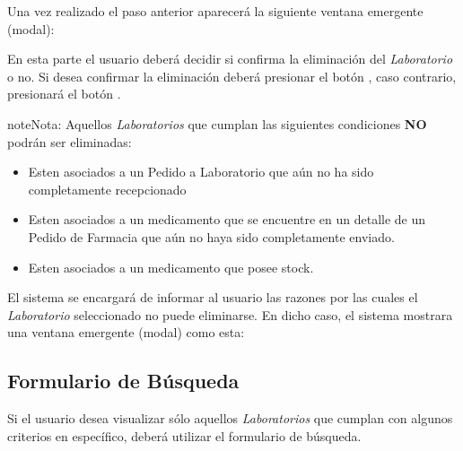 \documentclass[a4paper,10pt,spanish]{sphinxmanual}
\begin{document}

Una vez realizado el paso anterior aparecerá la siguiente ventana emergente (modal):


En esta parte el usuario deberá decidir si confirma la eliminación del \emph{Laboratorio} o no. Si desea confirmar la eliminación deberá presionar el botón , caso contrario, presionará el botón .

\begin{notice}{note}{Nota:}
Aquellos \emph{Laboratorios} que cumplan las siguientes condiciones \textbf{NO} podrán ser eliminadas:
\begin{itemize}
\item {} 
Esten asociados a un Pedido a Laboratorio que aún no ha sido completamente recepcionado

\item {} 
Esten asociados a un medicamento que se encuentre en un detalle de un Pedido de Farmacia que aún no haya sido completamente enviado.

\item {} 
Esten asociados a un medicamento que posee stock.

\end{itemize}

El sistema se encargará de informar al usuario las razones por las cuales el \emph{Laboratorio} seleccionado no puede eliminarse. En dicho caso, el sistema mostrara una ventana emergente (modal) como esta:

\end{notice}


\subsection{Formulario de Búsqueda}
\label{laboratorios:formulario-de-busqueda}\label{laboratorios:formulario-busqueda-laboratorio}
Si el usuario desea visualizar sólo aquellos \emph{Laboratorios} que cumplan con algunos criterios en específico, deberá utilizar el formulario de búsqueda.
\end{document}
